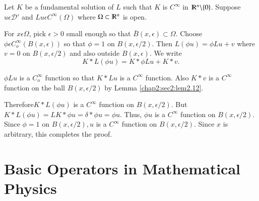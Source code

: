 \setcounter{proof of theorem}{10}
\begin{proof of theorem} %
  Let $K$ be a fundamental solution of $L$ such that $K$ is
  $C^{\infty}$ in $\varmathbb{R}^n \backslash\{0\}$. Suppose $u
  \epsilon \mathcal{D}'$ and $Lu \epsilon C^{\infty}(\Omega)$
  where $\Omega \subset \varmathbb{R}^n $ is open. 
\end{proof of theorem}

For $x \epsilon \Omega$, pick $\epsilon >0$ small enough so that
$\bar{B}(x, \epsilon) \subset \Omega$. Choose $ \phi \epsilon
C^{\infty}_{o} (B (x, \epsilon ))$ so that $\phi =1 $ on $B(x,
\epsilon /2)$. Then $L( \phi u)=\phi Lu +v$ where $v=0$ on $B(x,
\epsilon /2)$ and also outside $B(x, \epsilon )$. We write 
$$
K * L (\phi u) = K * \phi Lu + K * v.
$$

$\phi Lu$ is a $C^{\infty}_o$ function so that $K * Lu $ is a
$C^{\infty}$ function. Also $K * v $ is a $C^{\infty}$ function on the
ball $B(x, \epsilon /2) $ by Lemma \ref{chap2:sec2:lem2.12}. 

Therefore\pageoriginale $K * L ( \phi u) $ is a $C^{\infty} $ function on $B(x,
\epsilon /2)$. But $K* L(\phi u) = LK * \phi u = \delta * \phi u =
\phi u$. Thus, $\phi u $ is a $C^{\infty}$ function on $B(x,
\epsilon /2)$. Since $\phi = 1 $ on $ B(x, \epsilon /2), u $ is
a $C^{\infty}$ function on $B(x, \epsilon /2 )$. Since $x$ is
arbitrary, this completes the proof. 

\section{Basic Operators in Mathematical Physics}\label{chap2:sec3}

